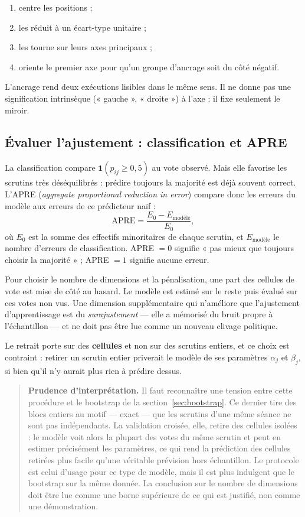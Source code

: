 \documentclass[11pt,a4paper]{article}
\newcommand{\ind}{\mathbf{1}}
\newcommand{\prudence}[1]{\begin{quote}\small\color{red!55!black}\textbf{Prudence d'interprétation.} #1\end{quote}}
\begin{document}
\begin{enumerate}
  \item centre les positions ;
  \item les réduit à un écart-type unitaire ;
  \item les tourne sur leurs axes principaux ;
  \item oriente le premier axe pour qu'un groupe d'ancrage soit du côté négatif.
\end{enumerate}

L'ancrage rend deux exécutions lisibles dans le même sens. Il ne donne pas une
signification intrinsèque (« gauche », « droite ») à l'axe : il fixe seulement
le miroir.

\subsection{Évaluer l'ajustement : classification et APRE}

La classification compare $\ind(p_{ij}\geq0{,}5)$ au vote observé. Mais elle
favorise les scrutins très déséquilibrés : prédire toujours la majorité est déjà
souvent correct. L'APRE (\emph{aggregate proportional reduction in error})
compare donc les erreurs du modèle aux erreurs de ce prédicteur naïf :
\[
 \mathrm{APRE}=\frac{E_0-E_{\text{modèle}}}{E_0},
\]
où $E_0$ est la somme des effectifs minoritaires de chaque scrutin, et
$E_{\text{modèle}}$ le nombre d'erreurs de classification. APRE $=0$ signifie
« pas mieux que toujours choisir la majorité » ; APRE $=1$ signifie aucune erreur.

Pour choisir le nombre de dimensions et la pénalisation, une part des cellules
de vote est mise de côté au hasard. Le modèle est estimé sur le reste puis
évalué sur ces votes non vus. Une dimension supplémentaire qui n'améliore que
l'ajustement d'apprentissage est du \emph{surajustement} — elle a mémorisé du
bruit propre à l'échantillon — et ne doit pas être lue comme un nouveau clivage
politique.

Le retrait porte sur des \textbf{cellules} et non sur des scrutins entiers, et
ce choix est contraint : retirer un scrutin entier priverait le modèle de ses
paramètres $\alpha_j$ et $\beta_j$, si bien qu'il n'y aurait plus rien à
prédire dessus.

\prudence{Il faut reconnaître une tension entre cette procédure et le bootstrap
de la section~\ref{sec:bootstrap}. Ce dernier tire des blocs entiers au motif —
exact — que les scrutins d'une même séance ne sont pas indépendants. La
validation croisée, elle, retire des cellules isolées : le modèle voit alors la
plupart des votes du même scrutin et peut en estimer précisément les
paramètres, ce qui rend la prédiction des cellules retirées plus facile qu'une
véritable prévision hors échantillon. Le protocole est celui d'usage pour ce
type de modèle, mais il est plus indulgent que le bootstrap sur la même donnée.
La conclusion sur le nombre de dimensions doit être lue comme une borne
supérieure de ce qui est justifié, non comme une démonstration.}
\end{document}
